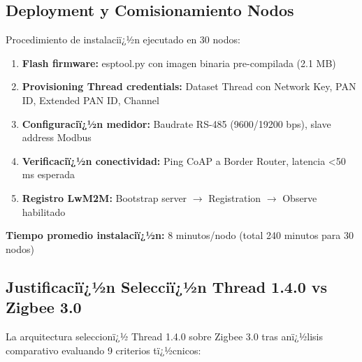 \subsection{Deployment y Comisionamiento Nodos}
\label{sec:impl-nodos-deployment}

Procedimiento de instalaciï¿½n ejecutado en 30 nodos:

\begin{enumerate}
\item \textbf{Flash firmware:} esptool.py con imagen binaria pre-compilada (2.1 MB)
\item \textbf{Provisioning Thread credentials:} Dataset Thread con Network Key, PAN ID, Extended PAN ID, Channel
\item \textbf{Configuraciï¿½n medidor:} Baudrate RS-485 (9600/19200 bps), slave address Modbus
\item \textbf{Verificaciï¿½n conectividad:} Ping CoAP a Border Router, latencia <50 ms esperada
\item \textbf{Registro LwM2M:} Bootstrap server $\rightarrow$ Registration $\rightarrow$ Observe habilitado
\end{enumerate}

\textbf{Tiempo promedio instalaciï¿½n:} 8 minutos/nodo (total 240 minutos para 30 nodos)

\subsection{Justificaciï¿½n Selecciï¿½n Thread 1.4.0 vs Zigbee 3.0}
\label{sec:impl-thread-justification}

La arquitectura seleccionï¿½ Thread 1.4.0 sobre Zigbee 3.0 tras anï¿½lisis comparativo evaluando 9 criterios tï¿½cnicos:

